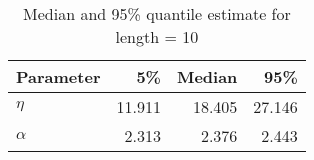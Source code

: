 \begin{table}[ht]
\centering
\begin{tabular}{lrrr}
  \hline
Parameter & 5\% & Median & 95\% \\ 
  \hline
$\eta$ & 11.911 & 18.405 & 27.146 \\ 
  $\alpha$ & 2.313 & 2.376 & 2.443 \\ 
   \hline
\end{tabular}
\caption{Median and 95\% quantile estimate for length = 10} 
\end{table}
